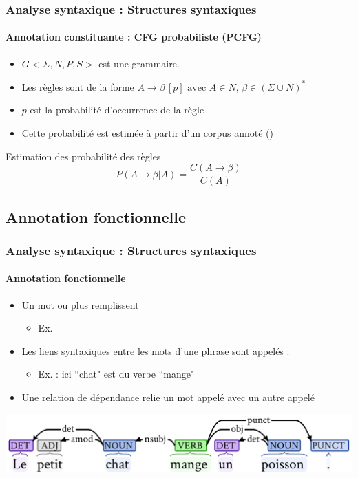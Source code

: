 \documentclass[xcolor=table]{beamer}
\begin{document}
\begin{frame}
\frametitle{Analyse syntaxique : Structures syntaxiques}
\framesubtitle{Annotation constituante : CFG probabiliste (PCFG)}

\begin{itemize}
	\item $G <\Sigma, N, P, S>$ est une grammaire.
	\item Les règles sont de la forme $A \rightarrow \beta\, [p] \text{ avec } A \in N,\, \beta \in (\Sigma \cup N)^*$
	\item $p$ est la probabilité d'occurrence de la règle
	\item Cette probabilité est estimée à partir d'un corpus annoté ()
\end{itemize}

\begin{block}{Estimation des probabilité des règles}
	\[
	P(A \rightarrow \beta | A) = \frac{C(A \rightarrow \beta)}{C(A)}
	\]
\end{block}

\end{frame}

\subsection{Annotation fonctionnelle}

\begin{frame}
\frametitle{Analyse syntaxique : Structures syntaxiques}
\framesubtitle{Annotation fonctionnelle}

\begin{itemize}
	\item Un mot ou plus remplissent 
	\begin{itemize}
		\item Ex. 
	\end{itemize}
	\item Les liens syntaxiques entre les mots d'une phrase sont appelés : 
	\begin{itemize}
		\item Ex.  : ici ``chat" est  du verbe ``mange"
	\end{itemize}
	\item Une relation de dépendance relie un mot appelé  avec un autre appelé 
\end{itemize}

\includegraphics[width=\textwidth]{../img/intro/gram-dep2_.pdf}

\end{frame}
\end{document}
